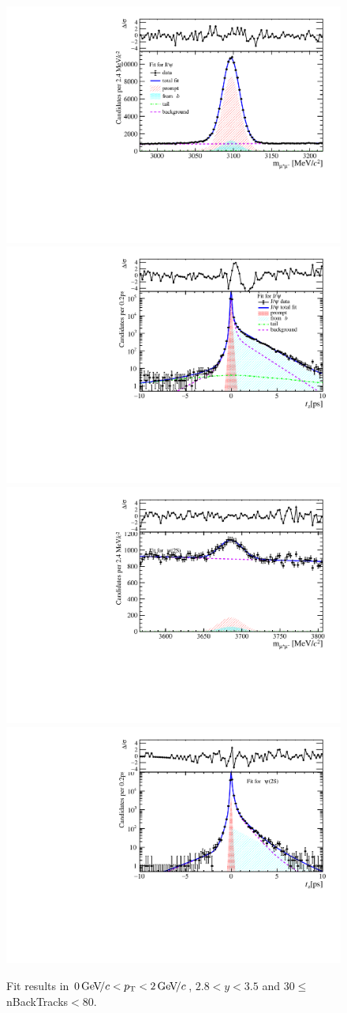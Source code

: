 \begin{figure}[H]
\begin{center}
\includegraphics[width=0.47\linewidth]{pdf/Jpsi/drawmassB/n5y2pt1.pdf}
\includegraphics[width=0.47\linewidth]{pdf/Jpsi/2DFitB/n5y2pt1.pdf}
\vspace*{-0.5cm}
\includegraphics[width=0.47\linewidth]{pdf/Psi2S/drawmassB/n5y2pt1.pdf}
\includegraphics[width=0.47\linewidth]{pdf/Psi2S/2DFitB/n5y2pt1.pdf}
\vspace*{-0.5cm}
\end{center}
\caption{Fit results in $0\text{\,Ge\kern -0.1em V\!/}c<p_{\mathrm{T}}<2\text{\,Ge\kern -0.1em V\!/}c$, $2.8<y<3.5$ and 30$\leq$nBackTracks$<$80.}
\label{Fitn5y2pt1}
\end{figure}
